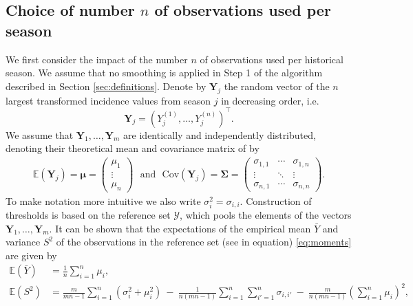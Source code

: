 \documentclass{article}
\newcommand{\mean}{\bar{y}}
\begin{document}
\subsection{Choice of number $n$ of observations used per season}
\label{subsec:choice_n}

We first consider the impact of the number $n$ of observations used per historical season. We assume that no smoothing is applied in Step 1 of the algorithm described in Section \ref{sec:definitions}. Denote by $\mathbf{Y}_j$ the random vector of the $n$ largest transformed incidence values from season $j$ in decreasing order, i.e.
$$
\mathbf{Y}_j = (Y^{(1)}_j, \dots, Y^{(n)}_j)^\top.
$$
We assume that $\mathbf{Y}_1, \dots, \mathbf{Y}_m$ are identically and independently distributed, denoting their theoretical mean and covariance matrix of by
\begin{align}
\mathbb{E}\left(\mathbf{Y}_j\right) = \boldsymbol{\mu} = \left(\begin{array}{c}
\mu_1\\
\vdots\\
\mu_n
\end{array}\right) \ \ \ \text{and} \ \ \ \text{Cov}\left(\mathbf{Y}_j\right) = \boldsymbol{\Sigma} =
\left(\begin{array}{ccc}
\sigma_{1, 1} & \cdots & \sigma_{1, n}\\
\vdots & \ddots &\vdots\\
\sigma_{n, 1} & \cdots & \sigma_{n, n}
\end{array}\right).
\end{align}
To make notation more intuitive we also write $\sigma^2_i = \sigma_{i, i}$. Construction of thresholds is based on the reference set $\mathcal{Y}$, which pools the elements of the vectors $\mathbf{Y}_1, \dots, \mathbf{Y}_m$. It can be shown that the expectations of the empirical mean $\bar{Y}$ and variance $S^2$ of the observations in the reference set (see in equation) \eqref{eq:moments} are given by
\begin{align}
\mathbb{E}(\bar{Y}) & = \frac{1}{n} \sum_{i = 1}^n \mu_i,
\label{eq:expectation_mu}\\
\mathbb{E}(S^2) & = \frac{m}{mn - 1} \sum_{i = 1}^n (\sigma_{i}^2 + \mu_i^2) \ - \ \frac{1}{n(mn - 1)} \sum_{i = 1}^n \sum_{i' = 1}^n \sigma_{i,i'} \ - \ \frac{m}{n(mn - 1)}\left(\sum_{i = 1}^n \mu_i\right)^2,
\label{eq:expectation_sigma2}
\end{align}
\end{document}
